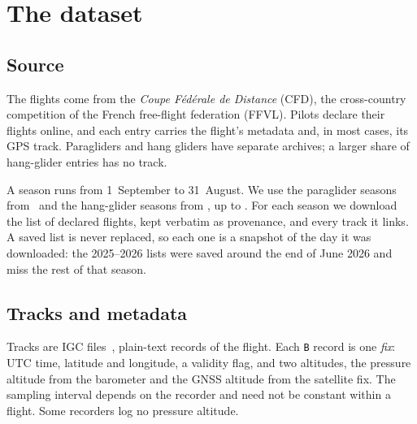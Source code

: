 \chapter{The dataset}
\label{ch:dataset}

\section{Source}
\label{sec:source}

The flights come from the \emph{Coupe F\'ed\'erale de Distance} (CFD), the
cross-country competition of the French free-flight federation (FFVL). Pilots declare
their flights online, and each entry carries the flight's metadata and, in most
cases, its GPS track. Paragliders and hang gliders have separate archives; a larger
share of hang-glider entries has no track.

A season runs from 1~September to 31~August. We use the paraglider seasons from
\ParaSeasonFirst\ and the hang-glider seasons from \HangSeasonFirst, up to \ParaSeasonLast. For each
season we download the list of declared flights, kept verbatim as provenance, and
every track it links. A saved list is never replaced, so each one is a snapshot of
the day it was downloaded: the 2025--2026 lists were saved around the end of June
2026 and miss the rest of that season.

\begin{table}[htbp]
\centering\small
\caption{Paraglider flights per season.}
\label{tab:seasons-para}

\end{table}

\begin{table}[htbp]
\centering\small
\caption{Hang-glider flights per season.}
\label{tab:seasons-hang}

\end{table}

\section{Tracks and metadata}
\label{sec:tracks}

Tracks are IGC files~\cite{fai_igc_spec}, plain-text records of the flight. Each
\texttt{B} record is one \emph{fix}: UTC time, latitude and longitude, a validity flag,
and two altitudes, the pressure altitude from the barometer and the GNSS altitude from
the satellite fix. The sampling interval depends on the recorder and need not be
constant within a flight. Some recorders log no pressure altitude.

